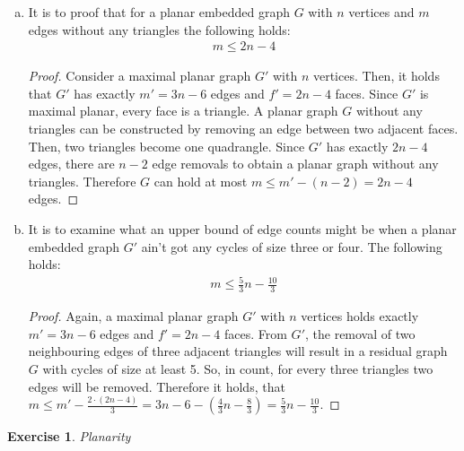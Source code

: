 \documentclass[a4paper,12pt,headsepline]{scrartcl}
\newtheorem{aufgabe}{Exercise}
\begin{document}
\begin{enumerate}[a)]
	\item It is to proof that for a planar embedded graph $G$ with $n$ vertices and $m$ edges without any triangles the following holds:
	\begin{align*}
		m \leq 2n-4
	\end{align*}
	\begin{proof}
		Consider a maximal planar graph $G'$ with $n$ vertices. Then, it holds that $G'$ has exactly $m' = 3n-6$ edges and $f' = 2n-4$ faces. Since $G'$ is maximal planar, every face is a triangle. A planar graph $G$ without any triangles can be constructed by removing an edge between two adjacent faces. Then, two triangles become one quadrangle. Since $G'$ has exactly $2n-4$ edges, there are $n-2$ edge removals to obtain a planar graph without any triangles. Therefore $G$ can hold at most $m \leq m' - (n-2) = 2n -4$ edges.
	\end{proof}
	\item It is to examine what an upper bound of edge counts might be when a planar embedded graph $G'$ ain't got any cycles of size three or four. The following holds:
	\begin{align*}
		m \leq \frac{5}{3}n - \frac{10}{3}
	\end{align*}
	\begin{proof}
		Again, a maximal planar graph $G'$ with $n$ vertices holds exactly $m' = 3n-6$ edges and $f' = 2n-4$ faces. From $G'$, the removal of two neighbouring edges of three adjacent triangles will result in a residual graph $G$ with cycles of size at least 5. So, in count, for every three triangles two edges will be removed. Therefore it holds, that $m \leq m' - \frac{2\cdot (2n-4)}{3} = 3n-6 - (\frac{4}{3}n - \frac{8}{3}) = \frac{5}{3}n - \frac{10}{3}$.
	\end{proof}
\end{enumerate}
\newpage
\begin{aufgabe}Planarity
\end{aufgabe}
\end{document}
